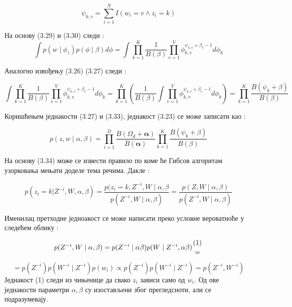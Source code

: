\begin{equation}
\psi_{k,v} = \sum_{i=1}^N I(w_i=v \wedge z_i = k)
\end{equation} 

На основу (3.29) и (3.30) следи :
\begin{equation}
\int p(w \mid \phi_z)p(\phi \mid \beta)d\phi = \int \prod_{k=1}^K \frac{1}{B(\beta)}\prod_{v=1}^V\phi_{k,v}^{\psi_{k,v}+\beta_v -1}d\phi_k
\end{equation}

Аналогно извођењу (3.26) (3.27) следи :

\begin{equation}
\int \prod_{k=1}^K \frac{1}{B(\beta)}\prod_{v=1}^V\phi_{k,v}^{\psi_{k,v}+\beta_v -1}d\phi_k =\prod_{k=1}^K (\frac{1}{B(\beta)} \int \prod_{v=1}^V\phi_{k,v}^{\psi_{k,v}+\beta_v -1}d\phi_k) = \prod_{k=1}^K \frac{B(\psi_k +\beta)}{B(\beta)}
\end{equation}

Коришћењем једнакости (3.27) и (3.33), једнакост (3.23) се може записати као :

\begin{equation}
p(z,w \mid \alpha,\beta) = \prod_{i=1}^D \frac{B(\Omega_d+\mathbf{\alpha})}{B(\mathbf{\alpha})}\prod_{k=1}^K \frac{B(\psi_k +\beta)}{B(\beta)}
\end{equation}

На основу (3.34) може се извести правило по коме ће Гибсов алгоритам узорковања мењати доделе тема речима. Дакле :

\begin{equation}
p(z_i=k|Z^{-i},W,\alpha,\beta) = \frac{p(z_i=k,Z^{-i},W \mid \alpha,\beta}{p(Z^{-i},W \mid \alpha,\beta)} = \frac{p(Z,W \mid \alpha,\beta)}{p(Z^{-i},W \mid \alpha,\beta)}
\end{equation}

Именилац претходне једноакост се може написати преко условне вероватноће у следећем облику :

\begin{equation}
p(Z^{-i},W \mid \alpha,\beta) = p(Z^{-i}\mid \alpha\beta)p(W \mid Z^{-i},\alpha\beta ){(1) \atop = } 
\end{equation}

\begin{equation}
=p(Z^{-i})p(W^{-i} \mid Z^{-i})p(w_i) \propto  p(Z^{-i})p(W^{-i} \mid Z^{-i})  = p(Z^{-i},W^{-i})
\end{equation}
Једнакост (1) следи из чињенице да свако $z_i$ зависи само од $w_i$. Од ове једнакости параметри $\alpha, \beta$ су изостављени због прегледсноти, али се подразумевају.

